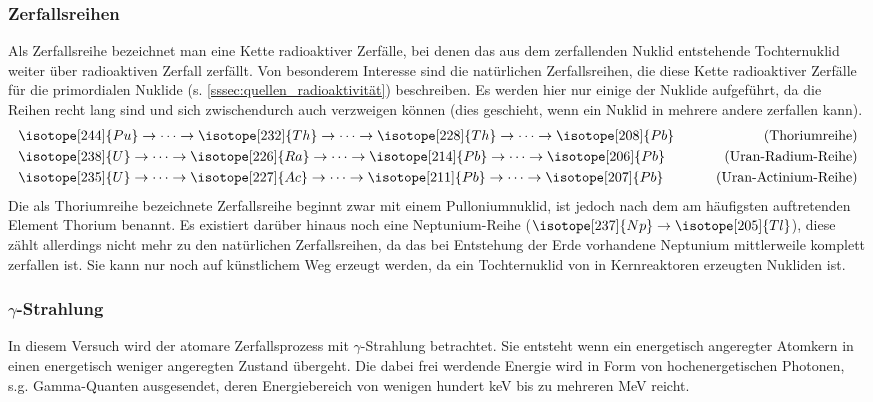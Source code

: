 \documentclass[11pt, a4paper]{article}
\numberwithin{equation}{section}
\begin{document}
\subsubsection{Zerfallsreihen}

Als Zerfallsreihe bezeichnet man eine Kette radioaktiver Zerfälle, bei denen das aus dem zerfallenden Nuklid entstehende Tochternuklid weiter über radioaktiven Zerfall zerfällt.
Von besonderem Interesse sind die natürlichen Zerfallsreihen, die diese Kette radioaktiver Zerfälle für die primordialen Nuklide (s. \ref{sssec:quellen_radioaktivität}) beschreiben.
Es werden hier nur einige der Nuklide aufgeführt, da die Reihen recht lang sind und sich zwischendurch auch verzweigen können (dies geschieht, wenn ein Nuklid in mehrere andere zerfallen kann).
\begin{align*}
	&\isotope[244]{Pu}\to\dots\to\isotope[232]{Th}\to\dots\to\isotope[228]{Th}\to\dots\to\isotope[208]{Pb} &\qquad\text{(Thoriumreihe)}\\
	&\isotope[238]{U}\to\dots\to\isotope[226]{Ra}\to\dots\to\isotope[214]{Pb}\to\dots\to\isotope[206]{Pb} &\qquad\text{(Uran-Radium-Reihe)}\\
	&\isotope[235]{U}\to\dots\to\isotope[227]{Ac}\to\dots\to\isotope[211]{Pb}\to\dots\to\isotope[207]{Pb} &\qquad\text{(Uran-Actinium-Reihe)}
\end{align*}
Die als Thoriumreihe bezeichnete Zerfallsreihe beginnt zwar mit einem Pulloniumnuklid, ist jedoch nach dem am häufigsten auftretenden Element Thorium benannt.
Es existiert darüber hinaus noch eine Neptunium-Reihe ($\isotope[237]{Np}\to\isotope[205]{Tl}$), diese zählt allerdings nicht mehr zu den natürlichen Zerfallsreihen, da das bei Entstehung der Erde vorhandene Neptunium mittlerweile komplett zerfallen ist.
Sie kann nur noch auf künstlichem Weg erzeugt werden, da  ein Tochternuklid von in Kernreaktoren erzeugten Nukliden ist.

\subsubsection{$\gamma$-Strahlung}

In diesem Versuch wird der atomare Zerfallsprozess mit $\gamma$-Strahlung betrachtet.
Sie entsteht wenn ein energetisch angeregter Atomkern in einen energetisch weniger angeregten Zustand übergeht.
Die dabei frei werdende Energie wird in Form von hochenergetischen Photonen, s.g. Gamma-Quanten ausgesendet, deren Energiebereich von wenigen hundert \si{\kilo\electronvolt} bis zu mehreren \si{\mega\electronvolt} reicht.
\end{document}
